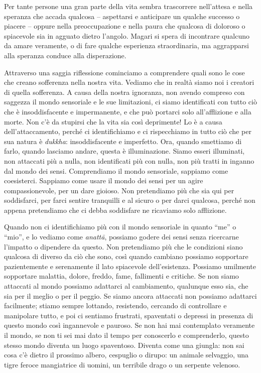 Per tante persone una gran parte della vita sembra trascorrere
nell'attesa e nella speranza che accada qualcosa -- aspettarsi e
anticipare un qualche successo o piacere -- oppure nella preoccupazione
e nella paura che qualcosa di doloroso o spiacevole sia in agguato
dietro l'angolo. Magari si spera di incontrare qualcuno da amare
veramente, o di fare qualche esperienza straordinaria, ma aggrapparsi
alla speranza conduce alla disperazione.

Attraverso una saggia riflessione cominciamo a comprendere quali sono le
cose che creano sofferenza nella nostra vita. Vediamo che in realtà
siamo noi i creatori di quella sofferenza. A causa della nostra
ignoranza, non avendo compreso con saggezza il mondo sensoriale e le sue
limitazioni, ci siamo identificati con tutto ciò che è insoddisfacente e
impermanente, e che può portarci solo all'afflizione e alla morte. Non
c'è da stupirsi che la vita sia così deprimente! Lo è a causa
dell'attaccamento, perché ci identifichiamo e ci rispecchiamo in tutto
ciò che per sua natura è \emph{dukkha}: insoddisfacente e imperfetto.
Ora, quando smettiamo di farlo, quando lasciamo andare, questa è
illuminazione. Siamo esseri illuminati, non attaccati più a nulla, non
identificati più con nulla, non più tratti in inganno dal mondo dei
sensi. Comprendiamo il mondo sensoriale, sappiamo come coesisterci.
Sappiamo come usare il mondo dei sensi per un agire compassionevole, per
un dare gioioso. Non pretendiamo più che sia qui per soddisfarci, per
farci sentire tranquilli e al sicuro o per darci qualcosa, perché non
appena pretendiamo che ci debba soddisfare ne ricaviamo solo afflizione.

Quando non ci identifichiamo più con il mondo sensoriale in quanto
``me'' o ``mio'', e lo vediamo come \emph{anattā}, possiamo godere dei
sensi senza ricercarne l'impatto o dipendere da questo. Non pretendiamo
più che le condizioni siano qualcosa di diverso da ciò che sono, così
quando cambiano possiamo sopportare pazientemente e serenamente il lato
spiacevole dell'esistenza. Possiamo umilmente sopportare malattia,
dolore, freddo, fame, fallimenti e critiche. Se non siamo attaccati al
mondo possiamo adattarci al cambiamento, qualunque esso sia, che sia per
il meglio o per il peggio. Se siamo ancora attaccati non possiamo
adattarci facilmente; stiamo sempre lottando, resistendo, cercando di
controllare e manipolare tutto, e poi ci sentiamo frustrati, spaventati
o depressi in presenza di questo mondo così ingannevole e pauroso. Se
non hai mai contemplato veramente il mondo, se non ti sei mai dato il
tempo per conoscerlo e comprenderlo, questo stesso mondo diventa un
luogo spaventoso. Diventa come una giungla: non sai cosa c'è dietro il
prossimo albero, cespuglio o dirupo: un animale selvaggio, una tigre
feroce mangiatrice di uomini, un terribile drago o un serpente velenoso.

